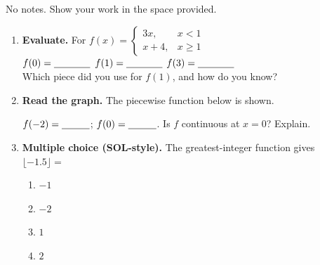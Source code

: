 \documentclass[10pt]{article}
\newcommand{\lgrid}[4]{%
  \draw[step=1, linegray!40, very thin] (#1,#3) grid (#2,#4);
  \draw[->, semithick, charcoal] (#1,0)--(#2,0) node[below right, font=\scriptsize]{$x$};
  \draw[->, semithick, charcoal] (0,#3)--(0,#4) node[left, font=\scriptsize]{$y$};}
\newcommand{\closeddot}[2]{\fill[forest] (#1,#2) circle (3.5pt);}
\newcommand{\opendot}[2]{\draw[very thick, forest, fill=white] (#1,#2) circle (3.5pt);}
\begin{document}

\vspace{0.10in}

No notes. Show your work in the space provided.

\begin{enumerate}[leftmargin=1.8em, itemsep=14pt]
  \item \textbf{Evaluate.} For $f(x)=\begin{cases} 3x, & x<1 \\ x+4, & x\ge 1 \end{cases}$
        \\[4pt]
        $f(0)=\blank{1.3cm}$ \qquad $f(1)=\blank{1.3cm}$ \qquad $f(3)=\blank{1.3cm}$
        \\[4pt]
        Which piece did you use for $f(1)$, and how do you know? 

  \item \textbf{Read the graph.} The piecewise function below is shown.
        \begin{center}
        \end{center}
        $f(-2)=\blank{1.0cm}$; \quad $f(0)=\blank{1.0cm}$. \quad Is $f$ continuous at $x=0$? Explain.

  \item \textbf{Multiple choice (SOL-style).} The greatest-integer function gives $\lfloor -1.5\rfloor=$
        \begin{enumerate}[label=(\Alph*), leftmargin=1.8em, itemsep=2pt]
          \item $-1$
          \item $-2$
          \item $1$
          \item $2$
        \end{enumerate}
\end{enumerate}
\end{document}
